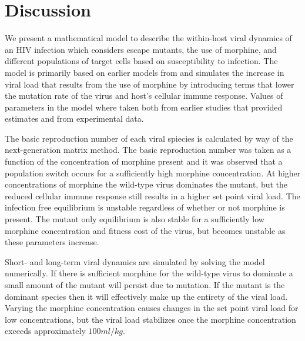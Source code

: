 \documentclass[11pt, oneside]{article}    %
\begin{document}






\section{Discussion}

We present a mathematical model to describe the within-host viral dynamics of an HIV infection which considers escape mutants, the use of morphine, and different populations of target cells based on susceptibility to infection. The model is primarily based on earlier models from \cite{Vaidya, Konrad} and simulates the increase in viral load that results from the use of morphine by introducing terms that lower the mutation rate of the virus and host's cellular immune response. Values of parameters in the model where taken both from earlier studies that provided estimates and from experimental data. 

	The basic reproduction number of each viral spiecies is calculated by way of the next-generation matrix method. The basic reproduction number was taken as a function of the concentration of morphine present and it was observed that a population switch occurs for a sufficiently high morphine concentration. At higher concentrations of morphine the wild-type virus dominates the mutant, but the reduced cellular immune response still results in a higher set point viral load. The infection free equilibrium is unstable regardless of whether or not morphine is present. The mutant only equilibrium is also stable for a sufficiently low morphine concentration and fitness cost of the virus, but becomes unstable as these parameters increase.

	Short- and long-term viral dynamics are simulated by solving the model numerically. If there is sufficient morphine for the wild-type virus to dominate a small amount of the mutant will persist due to mutation. If the mutant is the dominant species then it will effectively make up the entirety of the viral load. Varying the morphine concentration causes changes in the set point viral load for low concentrations, but the viral load stabilizes once the morphine concentration exceeds approximately $100 ml/kg$. 
	
\end{document}
